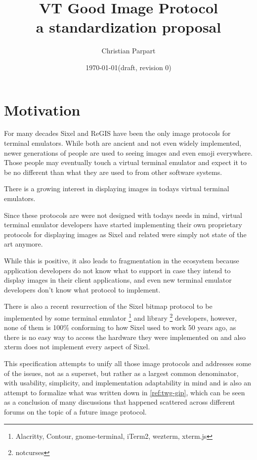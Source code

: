 \documentclass[a4paper]{article}
\title{VT Good Image Protocol \\
a standardization proposal}
\author{Christian Parpart}
\date{\today \quad (draft, revision 0)}
\begin{document}
\maketitle

\tableofcontents


\section{Motivation} %

For many decades Sixel and ReGIS have been the only image protocols for terminal emulators.
While both are ancient and not even widely implemented, newer generations of people are used
to seeing images and even emoji everywhere.
Those people may eventually touch a virtual terminal emulator and expect it to be no different
than what they are used to from other software systems.

There is a growing interest in displaying images in todays
virtual terminal emulators.

Since these protocols are were not designed with todays needs in mind,
virtual terminal emulator developers have started implementing their own
proprietary protocols for displaying images as Sixel and related
were simply not state of the art anymore.

While this is positive, it also leads to fragmentation in the ecosystem
because application developers do not know what to support in case they intend
to display images in their client applications, and even new terminal emulator
developers don't know what protocol to implement.

There is also a recent resurrection of the Sixel bitmap protocol
to be implemented by some terminal emulator
\footnote{Alacritty, Contour, gnome-terminal, iTerm2, wezterm, xterm.js}
and library \footnote{notcurses} developers,
however, none of them is 100\% conforming to how Sixel used to work 50 years ago,
as there is no easy way to access the hardware they were implemented on
and also xterm does not implement every aspect of Sixel.

This specification attempts to unify all those image protocols and addresses
some of the issues, not as a superset, but rather as a largest common denominator,
with usability, simplicity, and implementation adaptability in mind and
is also an attempt to formalize what was written down in \ref{ref:twg-gip},
which can be seen as a conclusion of many discussions that happened scattered
across different forums on the topic of a future image protocol.
\end{document}
